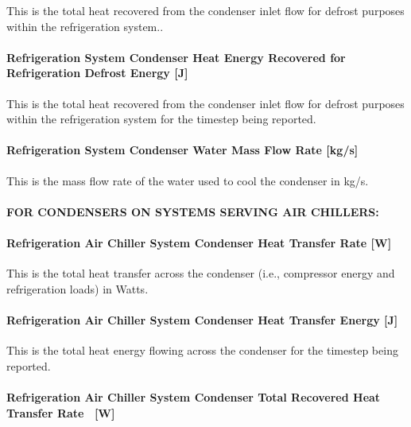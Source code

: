 This is the total heat recovered from the condenser inlet flow for defrost purposes within the refrigeration system..

\paragraph{Refrigeration System Condenser Heat Energy Recovered for Refrigeration Defrost Energy {[}J{]}}\label{refrigeration-system-condenser-heat-energy-recovered-for-refrigeration-defrost-energy-j}

This is the total heat recovered from the condenser inlet flow for defrost purposes within the refrigeration system for the timestep being reported.

\paragraph{Refrigeration System Condenser Water Mass Flow Rate {[}kg/s{]}}\label{refrigeration-system-condenser-water-mass-flow-rate-kgs}

This is the mass flow rate of the water used to cool the condenser in kg/s.

\paragraph{FOR CONDENSERS ON SYSTEMS SERVING AIR CHILLERS:}\label{for-condensers-on-systems-serving-air-chillers-2}

\paragraph{Refrigeration Air Chiller System Condenser Heat Transfer Rate {[}W{]}}\label{refrigeration-air-chiller-system-condenser-heat-transfer-rate-w-2}

This is the total heat transfer across the condenser (i.e., compressor energy and refrigeration loads) in Watts.

\paragraph{Refrigeration Air Chiller System Condenser Heat Transfer Energy {[}J{]}}\label{refrigeration-air-chiller-system-condenser-heat-transfer-energy-j-2}

This is the total heat energy flowing across the condenser for the timestep being reported.

\paragraph{Refrigeration Air Chiller System Condenser Total Recovered Heat Transfer Rate~ {[}W{]}}\label{refrigeration-air-chiller-system-condenser-total-recovered-heat-transfer-rate-w-2}

